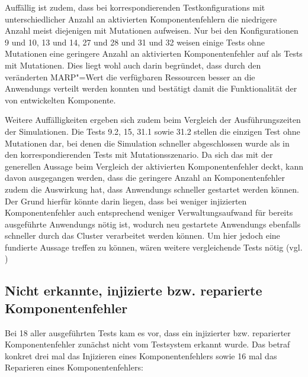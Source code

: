 Auffällig ist zudem, dass bei korrespondierenden \glspl{Testkonfiguration} mit unterschiedlicher Anzahl an aktivierten Komponentenfehlern die niedrigere Anzahl meist diejenigen mit Mutationen aufweisen.
Nur bei den Konfigurationen 9 und 10, 13 und 14, 27 und 28 und 31 und 32 weisen einige \glspl{Test} ohne Mutationen eine geringere Anzahl an aktivierten Komponentenfehler auf als \glspl{Test} mit Mutationen.
Dies liegt wohl auch darin begründet, dass durch den veränderten \gls{MARP}"=Wert die verfügbaren Ressourcen besser an die \glspl{Anwendung} verteilt werden konnten und bestätigt damit die Funktionalität der von \citeauthor{Zhang2016} entwickelten Komponente.

Weitere Auffälligkeiten ergeben sich zudem beim Vergleich der Ausführungszeiten der Simulationen.
Die \glspl{Test} 9.2, 15, 31.1 sowie 31.2 stellen die einzigen \gls{Test} ohne Mutationen dar, bei denen die Simulation schneller abgeschlossen wurde als in den korrespondierenden \glspl{Test} mit Mutationsszenario.
Da sich das mit der generellen Aussage beim Vergleich der aktivierten Komponentenfehler deckt, kann davon ausgegangen werden, dass die geringere Anzahl an Komponentenfehler zudem die Auswirkung hat, dass \glspl{Anwendung} schneller gestartet werden können.
Der Grund hierfür könnte darin liegen, dass bei weniger injizierten Komponentenfehler auch entsprechend weniger Verwaltungsaufwand für bereits ausgeführte \glspl{Anwendung} nötig ist, wodurch neu gestartete \glspl{Anwendung} ebenfalls schneller durch das Cluster verarbeitet werden können.
Um hier jedoch eine fundierte Aussage treffen zu können, wären weitere vergleichende \glspl{Test} nötig (vgl. )

\subsection{Nicht erkannte, injizierte bzw. reparierte Komponentenfehler}
\label{subsec:notDetectedFaults}

Bei 18 aller ausgeführten \glspl{Test} kam es vor, dass ein injizierter bzw. reparierter Komponentenfehler zunächst nicht vom Testsystem erkannt wurde.
Das betraf konkret drei mal das Injizieren eines Komponentenfehlers sowie 16 mal das Reparieren eines Komponentenfehlers:

